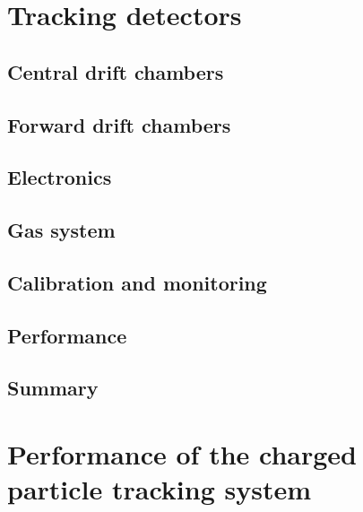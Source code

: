 \section{Tracking detectors \label{sec:tracking}}
\subsection{Central drift chambers \label{sec:cdc}}
\subsection{Forward drift chambers \label{sec:fdc}}
\subsection{Electronics \label{sec:dcelectronics}}
\subsection{Gas system \label{sec:gas}}
\subsection{Calibration and monitoring \label{sec:dccalib}}
\subsection{Performance \label{sec:dcperformance}}
\subsection{Summary \label{sec:dcsummary}}
 
\section{Performance of the charged particle tracking system}

